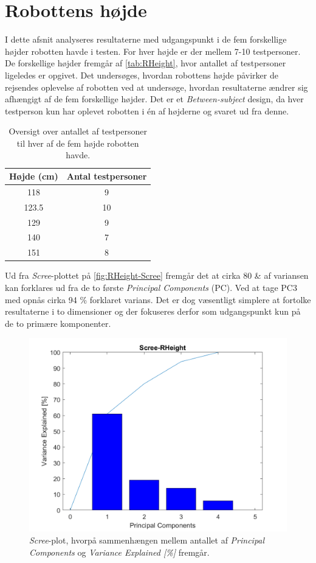 \section{Robottens højde}
\label{DatabehandlingRHeight}
%
I dette afsnit analyseres resultaterne med udgangspunkt i de fem forskellige højder robotten havde i testen. For hver højde er der mellem 7-10 testpersoner. De forskellige højder fremgår af \autoref{tab:RHeight}, hvor antallet af testpersoner ligeledes er opgivet. Det undersøges, hvordan robottens højde påvirker de rejsendes oplevelse af robotten ved at undersøge, hvordan resultaterne ændrer sig afhængigt af de fem forskellige højder. Det er et \textit{Between-subject} design, da hver testperson kun har oplevet robotten i én af højderne og svaret ud fra denne.
%
\begin{table}[H]
\centering
\begin{tabular}{c|c}
Højde (cm) & Antal testpersoner \\ \hline
118   & 9     \\ \hline
123.5 & 10    \\ \hline
129   & 9     \\ \hline
140   & 7     \\ \hline
151   & 8    \\
\end{tabular}
\caption{Oversigt over antallet af testpersoner til hver af de fem højde robotten havde.}
\label{tab:RHeight}
\end{table}
\noindent
%
Ud fra \textit{Scree}-plottet på \autoref{fig:RHeight-Scree} fremgår det at cirka 80 \& af variansen kan forklares ud fra de to første \textit{Principal Components} (PC). Ved at tage PC3 med opnås cirka 94 \% forklaret varians. Det er dog væsentligt simplere at fortolke resultaterne i to dimensioner og der fokuseres derfor som udgangspunkt kun på de to primære komponenter.
%
\begin{figure}[H]
\centering
\includegraphics[width=\textwidth]{Figure/DatabehandlingSkalaer/PCAfigures/RHeight-Scree.png}
\caption{\textit{Scree}-plot, hvorpå sammenhængen mellem antallet af \textit{Principal Components} og \textit{Variance Explained [\%]} fremgår.}
\label{fig:RHeight-Scree}
\end{figure}
